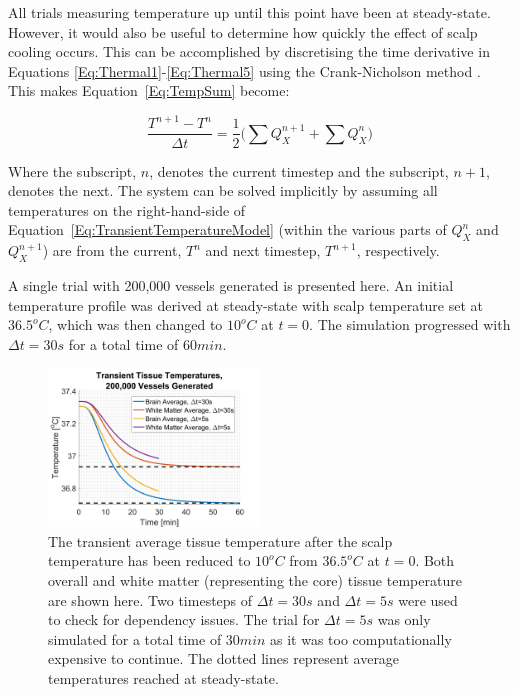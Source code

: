 \documentclass[11pt,english,a4paper,twoside,openright]{report}
\begin{document}
{{{{{{{All trials measuring temperature up until this point have been at steady-state. However, it would also be useful to determine how quickly the effect of scalp cooling occurs. This can be accomplished by discretising the time derivative in Equations \ref{Eq:Thermal1}-\ref{Eq:Thermal5} using the Crank-Nicholson method \cite{crank1947practical}. This makes Equation~\ref{Eq:TempSum} become:

\begin{equation}
\label{Eq:TransientTemperatureModel}
\frac{T^{n+1}-T^{n}}{\Delta t} = \frac{1}{2}\bigg(\sum Q^{n+1}_{X} + \sum Q^{n}_{X}\bigg) 
\end{equation} 

Where the subscript, $n$, denotes the current timestep and the subscript, $n+1$, denotes the next. The system can be solved implicitly by assuming all temperatures on the right-hand-side of Equation~\ref{Eq:TransientTemperatureModel} (within the various parts of $Q^{n}_{X}$ and $Q^{n+1}_{X}$) are from the current, $T^{n}$ and next timestep, $T^{n+1}$, respectively.

A single trial with 200,000 vessels generated is presented here. An initial temperature profile was derived at steady-state with scalp temperature set at $36.5^{o}C$, which was then changed to $10^{o}C$ at $t=0$. The simulation progressed with $\Delta t=30s$ for a total time of $60min$.

\begin{figure}[h]
	\centering
	\includegraphics[width=0.5\textwidth]{Chapter5/Chapter5_TransientTemperatureGraph}
	\caption[Transient reponse of average brain and white matter tissue temperatures to scalp cooling]{The transient average tissue temperature after the scalp temperature has been reduced to $10^{o}C$ from $36.5^{o}C$ at $t=0$. Both overall and white matter (representing the core) tissue temperature are shown here. Two timesteps of $\Delta t=30s$ and $\Delta t=5s$ were used to check for dependency issues. The trial for $\Delta t=5s$ was only simulated for a total time of $30min$ as it was too computationally expensive to continue. The dotted lines represent average temperatures reached at steady-state.}
	\label{fig:TransientResultGraph}
\end{figure}

}}}}}}}
\end{document}
